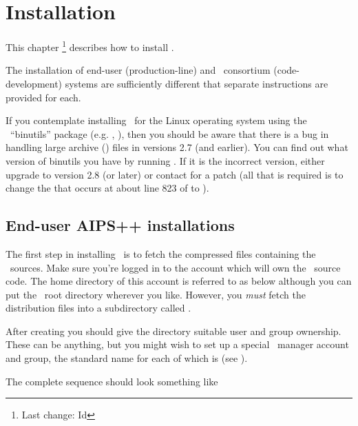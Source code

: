 \chapter{Installation}
\label{Installation}

This chapter \footnote{Last change:
$ $Id$ $}
describes how to install \aipspp.

The installation of end-user (production-line) and \aipspp\ consortium
(code-development) systems are sufficiently different that separate
instructions are provided for each.

If you contemplate installing \aipspp\ for the Linux operating system using
the \gnu\ ``binutils'' package (e.g. , ), then you should be
aware that there is a bug in handling large archive () files in
versions 2.7 (and earlier).  You can find out what version of binutils you
have by running .  If it is the incorrect version, either upgrade
to version 2.8 (or later) or contact  for a patch
(all that is required is to change the  that occurs at about line
823 of  to ).


\section{End-user AIPS++ installations}
\label{End-user installation}

The first step in installing \aipspp\ is to fetch the compressed 
files containing the \aipspp\ sources.  Make sure you're logged in to the
account which will own the \aipspp\ source code.  The home directory of this
account is referred to as  below although you can put the
\aipspp\ root directory wherever you like.  However, you {\em must} fetch the
distribution files into a subdirectory called .

After creating  you should give the directory suitable user and
group ownership.  These can be anything, but you might wish to set up a
special \aipspp\ manager account and group, the standard name for each of
which is  (see ).

The complete  sequence should look something like

